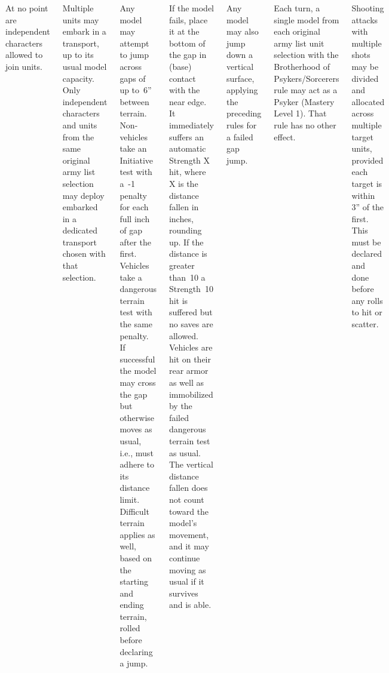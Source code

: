\begin{columns}
%

\vspace{-9pt}%
  At no point are independent
characters allowed to join units.

  Multiple units may embark
in a transport, up to its usual model capacity. Only independent
characters and units from the same original army list selection may
deploy embarked in a dedicated transport chosen with that selection.

  Any model may
attempt to jump across gaps of up to~6'' between terrain.
Non-vehicles take an Initiative test with a~-1 penalty for each full
inch of gap after the first.  Vehicles take a dangerous terrain test
with the same penalty.  If successful the model may cross the gap but
otherwise moves as usual, i.e., must adhere to its distance limit.
Difficult terrain applies as well, based on the starting and ending
terrain, rolled before declaring a jump.

If the model fails, place it at the bottom of the gap in (base)
contact with the near edge.  It immediately suffers an automatic
Strength X hit, where X is the distance fallen in inches, rounding up.
If the distance is greater than~10 a Strength~10 hit is suffered but
no saves are allowed.  Vehicles are hit on their rear armor as well as
immobilized by the failed dangerous terrain test as usual.  The
vertical distance fallen does not count toward the model's movement,
and it may continue moving as usual if it survives and is able.

Any model may also jump down a vertical surface, applying the
preceding rules for a failed gap jump.

%

\vspace{-9pt}%
  Each turn, a single
model from each original army list unit selection with the Brotherhood
of Psykers/Sorcerers rule may act as a Psyker (Mastery Level 1).  That
rule has no other effect.

%

\vspace{-9pt}%
  Shooting attacks with multiple shots may
be divided and allocated across multiple target units, provided each
target is within 3'' of the first.  This must be declared and done
before any rolls to hit or scatter.


\end{columns}
